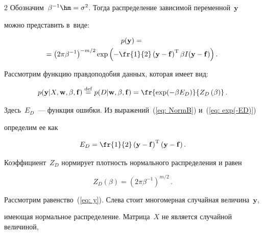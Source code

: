\begin{multicols}{2}
Обозначим~$\beta^{-1}\hm=\sigma^{2}$. Тогда распределение зависимой переменной~$\mathbf{y}$ 

можно представить в~виде:

\begin{multline}

\label {eq: NormB}

p(\mathbf{y})={}\\

\hspace*{-2mm}{}=\left(2\pi\beta^{-1}\right)^{-{m}/{2}}

\exp\left(-\fr{1}{2}\left(\mathbf{y}-\mathbf{f}\right)^{\mathrm{T}}\beta 

I(\mathbf{y}-\mathbf{f})\right).\!

\end{multline}

Рассмотрим функцию правдоподобия данных, которая имеет вид:

\begin{equation}

\label {eq: exp(-ED)}

p(\mathbf{y}|X,\mathbf{w},\beta,\mathbf{f})\mathrel{\stackrel{\mathrm{def}}{=}}p(D|\mathbf{w},\beta,

\mathbf{f})=\fr{\exp(-\beta E_D)}{Z_{D}\left(\beta\right)}\,.

\end{equation}

Здесь~$E_D$~--- функция ошибки. Из выражений~(\ref{eq: NormB}) и~(\ref{eq: exp(-ED)}) 

определим ее как

$$

E_D=\fr{1}{2}\left(\mathbf{y}-\mathbf{f}\right)^{\mathrm{T}}(\mathbf{y}-\mathbf{f})\,.

$$

Коэффициент~$Z_D$ нормирует плотность нормального распределения и равен

\begin{equation}

\label {eq: ZD}

Z_{D}(\beta)=(2\pi\beta^{-1})^{{m}/{2}}\,.

\end{equation}



Рассмотрим равенство~(\ref{eq: y}). Слева стоит многомерная случайная величина~$\mathbf{y}$, 

име\-ющая нормальное распределение. Матрица~$X$ не является случайной величиной, 


\end{multicols}
